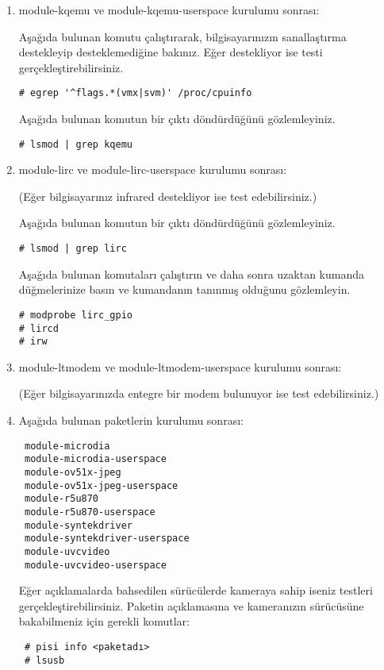 \documentclass[a4paper,10pt]{article}
\begin{document}
\begin{enumerate}
\item module-kqemu ve module-kqemu-userspace kurulumu sonrası:

Aşağıda bulunan komutu çalıştırarak, bilgisayarınızın sanallaştırma destekleyip desteklemediğine bakınız. Eğer destekliyor ise testi gerçekleştirebilirsiniz. 
\begin{verbatim}
# egrep '^flags.*(vmx|svm)' /proc/cpuinfo
\end{verbatim}

Aşağıda bulunan komutun bir çıktı döndürdüğünü gözlemleyiniz.
\begin{verbatim}
# lsmod | grep kqemu
\end{verbatim}

\item module-lirc ve module-lirc-userspace kurulumu sonrası:

(Eğer bilgisayarınız infrared destekliyor ise test edebilirsiniz.)

Aşağıda bulunan komutun bir çıktı döndürdüğünü gözlemleyiniz.
\begin{verbatim}
# lsmod | grep lirc
\end{verbatim}

Aşağıda bulunan komutaları çalıştırın ve daha sonra uzaktan kumanda düğmelerinize basın ve kumandanın tanınmış olduğunu gözlemleyin.
\begin{verbatim}
# modprobe lirc_gpio
# lircd
# irw  
\end{verbatim}
\item module-ltmodem ve module-ltmodem-userspace kurulumu sonrası:

(Eğer bilgisayarınızda entegre bir modem bulunuyor ise test edebilirsiniz.)


\item Aşağıda bulunan paketlerin kurulumu sonrası:
\begin{verbatim}
 module-microdia
 module-microdia-userspace
 module-ov51x-jpeg
 module-ov51x-jpeg-userspace
 module-r5u870
 module-r5u870-userspace
 module-syntekdriver
 module-syntekdriver-userspace
 module-uvcvideo
 module-uvcvideo-userspace
\end{verbatim}

Eğer açıklamalarda bahsedilen sürücülerde kameraya sahip iseniz testleri gerçekleştirebilirsiniz.
Paketin açıklamasına ve kameranızın sürücüsüne bakabilmeniz için gerekli komutlar:
\begin{verbatim}
 # pisi info <paketadı>
 # lsusb
\end{verbatim}


\end{enumerate}
\end{document}
